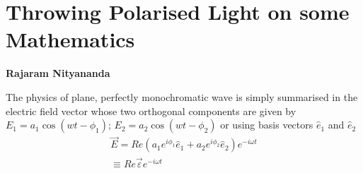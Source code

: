 
\chapter[Throwing Polarised Light on some Mathematics]{Throwing Polarised Light on some Mathematics}\label{chap26}




\begin{center}
\textbf{Rajaram Nityananda}
\end{center}

The physics of plane, perfectly monochromatic wave is simply summarised
in the electric field vector whose two orthogonal components are given by
$E_1 = a_1 \cos(wt - \phi_1)$; $E_2 = a_2 \cos(wt - \phi_2)$ or using basis vectors $\hat{e}_1$ and $\hat{e}_2$
\begin{gather*}
\overrightarrow{E} = Re (a_1 e^{i \phi_1 } \hat{e}_1 + a_2 e^{i\phi_2} \hat{e}_2 ) e^{-i\omega t} \\
\equiv Re \overrightarrow{\varepsilon} e^{-i\omega t}
\end{gather*}

